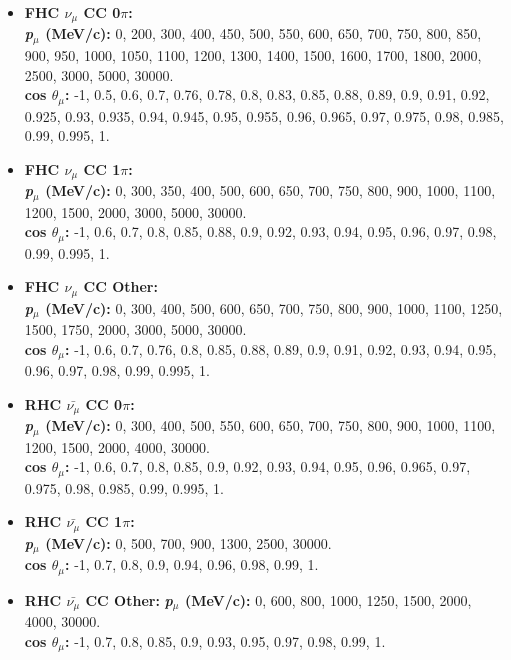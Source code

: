 \begin{itemize}

\item \textbf{FHC $\nu_{\mu}$ CC 0$\pi$:}\\
\textbf{\textit{p$_{\mu}$} (MeV/c):} 0, 200, 300, 400, 450, 500, 550, 600, 650, 700, 750, 800, 850, 900, 950, 1000, 1050, 1100, 1200, 1300, 1400, 1500, 1600, 1700, 1800, 2000, 2500, 3000, 5000, 30000.\\
\textbf{cos $\theta_{\mu}$:} -1, 0.5, 0.6, 0.7, 0.76, 0.78, 0.8, 0.83, 0.85, 0.88, 0.89, 0.9, 0.91, 0.92, 0.925, 0.93, 0.935, 0.94, 0.945, 0.95, 0.955, 0.96, 0.965, 0.97, 0.975, 0.98, 0.985, 0.99, 0.995, 1.

\item \textbf{FHC $\nu_{\mu}$ CC 1$\pi$:}\\
\textbf{\textit{p}$_{\mu}$ (MeV/c):} 0, 300, 350, 400, 500, 600, 650, 700, 750, 800, 900, 1000, 1100, 1200, 1500, 2000, 3000, 5000, 30000.\\
\textbf{cos $\theta_{\mu}$:} -1, 0.6, 0.7, 0.8, 0.85, 0.88, 0.9, 0.92, 0.93, 0.94, 0.95, 0.96, 0.97, 0.98, 0.99, 0.995, 1.

\item \textbf{FHC $\nu_{\mu}$ CC Other:}\\
\textbf{\textit{p}$_{\mu}$ (MeV/c):} 0, 300, 400, 500, 600, 650, 700, 750, 800, 900, 1000, 1100, 1250, 1500, 1750, 2000, 3000, 5000, 30000.\\
\textbf{cos $\theta_{\mu}$:} -1, 0.6, 0.7, 0.76, 0.8, 0.85, 0.88, 0.89, 0.9, 0.91, 0.92, 0.93, 0.94, 0.95, 0.96, 0.97, 0.98, 0.99, 0.995, 1.

\item \textbf{RHC $\bar{\nu_{\mu}}$ CC 0$\pi$:}\\
\textbf{\textit{p}$_{\mu}$ (MeV/c):} 0, 300, 400, 500, 550, 600, 650, 700, 750, 800, 900, 1000, 1100, 1200, 1500, 2000, 4000, 30000.\\
\textbf{cos $\theta_{\mu}$:} -1, 0.6, 0.7, 0.8, 0.85, 0.9, 0.92, 0.93, 0.94, 0.95, 0.96, 0.965, 0.97, 0.975, 0.98, 0.985, 0.99, 0.995, 1.

\item \textbf{RHC $\bar{\nu_{\mu}}$ CC 1$\pi$:}\\
\textbf{\textit{p}$_{\mu}$ (MeV/c):} 0, 500, 700, 900, 1300, 2500, 30000.\\
\textbf{cos $\theta_{\mu}$:}  -1, 0.7, 0.8, 0.9, 0.94, 0.96, 0.98, 0.99, 1.

\item \textbf{RHC $\bar{\nu_{\mu}}$ CC Other:}
\textbf{\textit{p}$_{\mu}$ (MeV/c):} 0, 600, 800, 1000, 1250, 1500, 2000, 4000, 30000.\\
\textbf{cos $\theta_{\mu}$:} -1, 0.7, 0.8, 0.85, 0.9, 0.93, 0.95, 0.97, 0.98, 0.99, 1.


\end{itemize}
